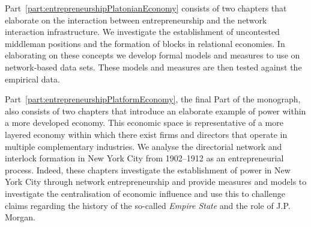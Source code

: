 Part~\ref{part:entrepreneurshipPlatonianEconomy} consists of two chapters that elaborate on the interaction between entrepreneurship and the network interaction infrastructure. We investigate the establishment of uncontested middleman positions and the formation of blocks in relational economies. In elaborating on these concepts we develop formal models and measures to use on network-based data sets. These models and measures are then tested against the empirical data.

Part~\ref{part:entrepreneurshipPlatformEconomy}, the final Part of the monograph, also consists of two chapters that introduce an elaborate example of power within a more developed economy. This economic space is representative of a more layered economy within which there exist firms and directors that operate in multiple complementary industries. We analyse the directorial network and interlock formation in New York City from 1902--1912 as an entrepreneurial process. Indeed, these chapters investigate the establishment of power in New York City through network entrepreneurship and provide measures and models to investigate the centralisation of economic influence and use this to challenge claims regarding the history of the so-called \emph{Empire State} and the role of J.P. Morgan.